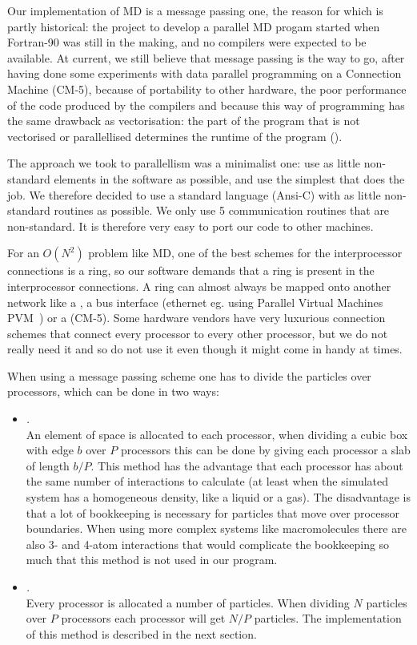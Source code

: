 Our implementation of MD is a message passing one, the reason for which
is partly historical: the project to develop a parallel MD progam started
when Fortran-90 was still in the making, and no compilers were
expected to be available. 
At current, we still believe that message passing is the way
to go, after having done some experiments with data parallel programming on a
Connection Machine (CM-5), because of portability to other hardware,
the poor performance of the code produced by the compilers 
and because this way of programming
has the same drawback as vectorisation: the part of the program that is
not vectorised or parallellised determines the runtime of the program
().

The approach we took to parallellism was a minimalist one: use as little
non-standard elements in the software as possible, and use the
simplest  that does the job. We therefore 
decided to use a standard language (Ansi-C) with as little non-standard
routines as possible. We only use 5 communication routines that are
non-standard. It is therefore very easy to port our code to other machines.

For an $O(N^2)$ problem like MD, one of the best schemes for the 
interprocessor connections is a ring, so our software demands that
a ring is present in the interprocessor connections. A ring can 
almost always be mapped onto another network like a , a bus
interface (ethernet eg. using Parallel Virtual Machines PVM~\cite{pvm3})
or a  (CM-5). Some hardware vendors
have very luxurious connection schemes that connect every processor
to every other processor, but we do not really need it and so do not use
it even though it might come in handy at times.

When using a message passing scheme one has to divide the particles 
over processors, which can be done in two ways:
\begin{itemize}
\item	{\em {}.}\\
	An element of space is allocated to each processor, when dividing
	a cubic box with edge $b$ over $P$ processors this can be done 
	by giving
	each processor a slab of length $b/P$. This method 
	has the advantage
	that each processor has about the same number of interactions
	to calculate (at least when the simulated system has a homogeneous
	density, like a liquid or a gas). The disadvantage is that a lot of
	bookkeeping is necessary for particles that move over processor
	boundaries. When using more complex systems like macromolecules there
	are also 3- and 4-atom interactions that would 
	complicate the bookkeeping so much that this method is not used
	in our program.
\item	{\em {}.}\\
	Every processor is allocated a number of particles. When
	dividing $N$ particles over $P$ processors each processor will
	get $N/P$ particles. The implementation of this method
	is described in the next section.
\end{itemize}

